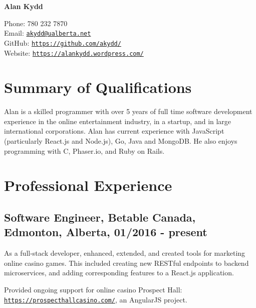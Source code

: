 \documentclass[10.5pt, letterpaper]{article}
\def\name{Alan Kydd}
\renewenvironment{itemize}{
  \begin{list}{}{
    \setlength{\leftmargin}{1.5em}
  }
}{
  \end{list}
}
\begin{document}
{\huge\bf\name}


\vspace{0.25in}

\begin{minipage}{0.45\linewidth}
  Phone: 780 232 7870 \\
  Email: \href{mailto:akydd@ualberta.net}{\tt akydd@ualberta.net} \\
  GitHub: \href{https://github.com/akydd/}{\tt https://github.com/akydd/} \\
  Website: \href{https://alankydd.wordpress.com/}{\tt https://alankydd.wordpress.com/}
\end{minipage}


\section*{Summary of Qualifications}
Alan is a skilled programmer with over 5 years of full time software development
experience in the online entertainment industry, in a startup, and in large
international corporations.  Alan has
current experience with JavaScript (particularly React.js and Node.js), Go, Java and MongoDB.
He also enjoys programming with C, Phaser.io, and Ruby on Rails.

\begin{comment}
\section*{Objective}
Work as a developer on a multi-tiered web application
\end{comment}

\section*{Professional Experience}

\subsection*{Software Engineer, Betable Canada, Edmonton, Alberta, 01/2016 - present}
\begin{itemize}
\item As a full-stack developer, enhanced, extended, and created tools for marketing online casino games.
This included creating new RESTful endpoints to backend microservices, and adding corresponding features to
a React.js application.
\item Provided ongoing support for online casino Prospect Hall: \href{https://prospecthallcasino.com/}{\tt https://prospecthallcasino.com/}, an AngularJS project.
\end{itemize}
\end{document}
